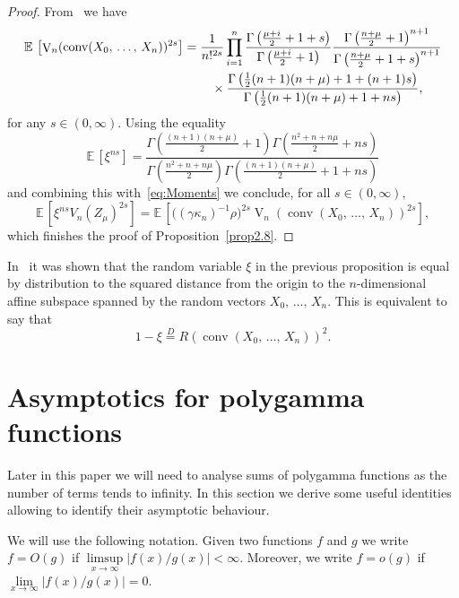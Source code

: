 \documentclass[AHL,Unicode,longabstracts,published]{cedram}
\newcommand{\EE}{\mathbb{E}\,}
\newcommand{\V}{\mathop{\mathrm{V}}\nolimits}
\newcommand{\eqdistr}{\stackrel{D}{=}}
\newcommand{\conv}{\mathop{\mathrm{conv}}\nolimits}
\begin{document}
\begin{proof}
From~\cite[Theorem~2.3]{GKT17} we have
\begin{align*}
\EE\left[\V_n(\conv(X_0,\,\ldots,\,X_n))^{2s}\right]&=\frac{1}{n!^{2s}}\prod\limits_{i=1}^n\frac{\Gamma\left(\frac{\mu+i}{2}+1+s\right)}{\Gamma\left(\frac{\mu+i}{2}+1\right)}\frac{\Gamma\left(\frac{n+\mu}{2}+1\right)^{n+1}}{\Gamma\left(\frac{n+\mu}{2}+1+s\right)^{n+1}}\\
&\mkern40mu\times\frac{\Gamma\left(\frac{1}{2}(n+1)(n+\mu)+1+(n+1)s\right)}{\Gamma\left(\frac{1}{2}(n+1)(n+\mu)+1+ns\right)},
\end{align*}
for any $s\in(0,\infty)$. Using the equality
\[
\EE[\xi^{ns}]=\frac{\Gamma\left(\frac{(n+1)(n+\mu)}{2}+1\right)\Gamma\left(\frac{n^2+n+n\mu}{2}+ns\right)}{\Gamma\left(\frac{n^2+n+n\mu}{2}\right)\Gamma\left(\frac{(n+1)(n+\mu)}{2}+1+ns\right)}
\]
and combining this with~\eqref{eq:Moments} we conclude, for all $s\in(0,\infty)$,
\[
\EE\left[\xi^{ns}V_n(Z_{\mu})^{2s}\right]=\EE\left[\big((\gamma\kappa_n)^{-1}\rho\big)^{2s}\V_n\left(\conv(X_0,\,\ldots,\,X_n)\right)^{2s}\right],
\]
which finishes the proof of Proposition~\ref{prop2.8}.
\end{proof}

\begin{rema}\label{rema2.9}
In~\cite[Theorem~2.7]{GKT17} it was shown that the random variable $\xi$ in the previous proposition is equal by distribution to the squared distance from the origin to the $n$-dimensional affine subspace spanned by the random vectors $X_0,\,\ldots,\,X_n$. This is equivalent to say that
\[
1-\xi\eqdistr R\left(\conv(X_0,\,\ldots,\,X_n)\right)^2.
\]
\end{rema}



\section{Asymptotics for polygamma functions}\label{sec:polygamma}

Later in this paper we will need to analyse sums of polygamma functions as the number of terms tends to infinity. In this section we derive some useful identities allowing to identify their asymptotic behaviour.

We will use the following notation. Given two functions $f$ and $g$ we write $f=O(g)$ if $\limsup\limits_{x\to\infty}|f(x)/g(x)|<\infty$. Moreover, we write $f=o(g)$ if $\lim\limits_{x\to\infty}|f(x)/g(x)|=0$.
\end{document}
